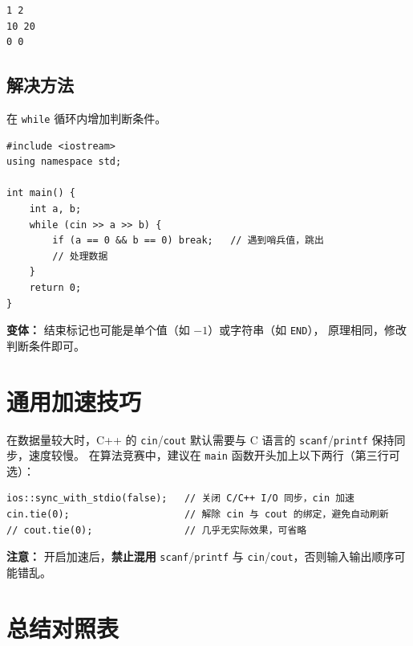 \documentclass[12pt, a4paper]{article}
\begin{document}
\begin{lstlisting}[style=input]
1 2
10 20
0 0
\end{lstlisting}

\subsection{解决方法}

在 \texttt{while} 循环内增加判断条件。

\begin{lstlisting}[style=cpp]
#include <iostream>
using namespace std;

int main() {
    int a, b;
    while (cin >> a >> b) {
        if (a == 0 && b == 0) break;   // 遇到哨兵值，跳出
        // 处理数据
    }
    return 0;
}
\end{lstlisting}

\textbf{变体：} 结束标记也可能是单个值（如 $-1$）或字符串（如 \texttt{END}），
原理相同，修改判断条件即可。

\section{通用加速技巧}

\begin{tipbox}
在数据量较大时，C++ 的 \texttt{cin}/\texttt{cout} 默认需要与 C 语言的
\texttt{scanf}/\texttt{printf} 保持同步，速度较慢。
在算法竞赛中，建议在 \texttt{main} 函数开头加上以下两行（第三行可选）：

\begin{lstlisting}[style=cpp, numbers=none]
ios::sync_with_stdio(false);   // 关闭 C/C++ I/O 同步，cin 加速
cin.tie(0);                    // 解除 cin 与 cout 的绑定，避免自动刷新
// cout.tie(0);                // 几乎无实际效果，可省略
\end{lstlisting}

\textbf{注意：} 开启加速后，\textbf{禁止混用} \texttt{scanf}/\texttt{printf} 与
\texttt{cin}/\texttt{cout}，否则输入输出顺序可能错乱。
\end{tipbox}

\section{总结对照表}
\end{document}
